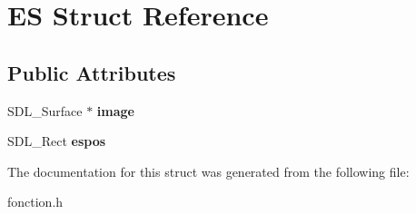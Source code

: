 \hypertarget{structES}{}\section{ES Struct Reference}
\label{structES}
\subsection*{Public Attributes}
\begin{DoxyCompactItemize}
\item 
\mbox{\label{structES_ac6ff08589bc438b1a97b273745374acf}} 
S\+D\+L\+\_\+\+Surface $\ast$ {\bfseries image}
\item 
\mbox{\label{structES_a657a23859f583d60a0579e88d05f63fe}} 
S\+D\+L\+\_\+\+Rect {\bfseries espos}
\end{DoxyCompactItemize}


The documentation for this struct was generated from the following file\+:\begin{DoxyCompactItemize}
\item 
fonction.\+h\end{DoxyCompactItemize}
